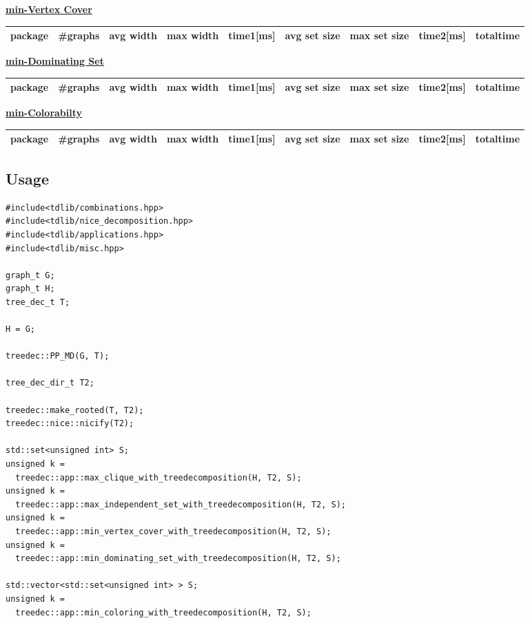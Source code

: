 \documentclass[a4wide]{article}
\begin{document}
\vspace*{5mm}

\underline{\textbf{min-Vertex Cover}} \\
\begin{tabular}{|l|l|l|l|l|l|l|l|l|}
\hline
package & \#graphs & avg width & max width & time1[ms] & avg set size & max set size & time2[ms] & totaltime \\
\hline
\hline

\hline
\end{tabular}

\newpage

\underline{\textbf{min-Dominating Set}} \\
\begin{tabular}{|l|l|l|l|l|l|l|l|l|}
\hline
package & \#graphs & avg width & max width & time1[ms] & avg set size & max set size & time2[ms] & totaltime \\
\hline
\hline

\hline
\end{tabular}

\vspace*{5mm}

\underline{\textbf{min-Colorabilty}} \\
\begin{tabular}{|l|l|l|l|l|l|l|l|l|}
\hline
package & \#graphs & avg width & max width & time1[ms] & avg set size & max set size & time2[ms] & totaltime \\
\hline
\hline

\hline
\end{tabular}

\subsection{Usage}

\begin{lstlisting}[mathescape]
#include<tdlib/combinations.hpp>
#include<tdlib/nice_decomposition.hpp>
#include<tdlib/applications.hpp>
#include<tdlib/misc.hpp>

graph_t G;
graph_t H;
tree_dec_t T;

H = G;

treedec::PP_MD(G, T);

tree_dec_dir_t T2;

treedec::make_rooted(T, T2);
treedec::nice::nicify(T2);

std::set<unsigned int> S;
unsigned k =
  treedec::app::max_clique_with_treedecomposition(H, T2, S);
unsigned k =
  treedec::app::max_independent_set_with_treedecomposition(H, T2, S);
unsigned k = 
  treedec::app::min_vertex_cover_with_treedecomposition(H, T2, S);
unsigned k =
  treedec::app::min_dominating_set_with_treedecomposition(H, T2, S);

std::vector<std::set<unsigned int> > S;
unsigned k =
  treedec::app::min_coloring_with_treedecomposition(H, T2, S);
\end{lstlisting}
\end{document}

